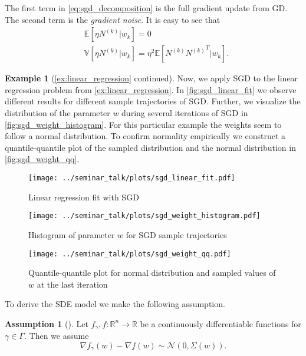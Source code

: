 \documentclass[12pt]{article}
\theoremstyle{definition}
\newtheorem{example}[example]{Example}
\newtheorem{assumption}[assumption]{Assumption}
\numberwithin{equation}{section}
\newcommand{\R}{\mathbb{R}}
\newcommand{\CN}{\mathcal{N}}
\newcommand{\ev}[1]{\mathbb{E}\left[{#1}\right]}
\newcommand{\var}[1]{\mathbb{V}\left[{#1}\right]}
\begin{document}
The first term in \eqref{eq:sgd_decomposition} is the full gradient update from GD. The second term is the \emph{gradient noise}. It is easy to see that 
\begin{align*}
  &\ev{\eta N^{(k)}|w_{k}} = 0 \\
  &\var{\eta N^{(k)}|w_{k}} = \eta^2 \ev{N^{(k)}{N^{(k)}}^T|w_{k}}.
\end{align*}
\begin{example}[\autoref{ex:linear_regression} continued]
  Now, we apply SGD to the linear regression problem from \autoref{ex:linear_regression}. In \autoref{fig:sgd_linear_fit} we observe different results for different sample trajectories of SGD.
  Further, we visualize the distribution of the parameter $w$ during several iterations of SGD in \autoref{fig:sgd_weight_histogram}. For this particular example the weights seem to follow a normal distribution. To confirm normality empirically we construct a quantile-quantile plot of the sampled distribution and the normal distribution in \autoref{fig:sgd_weight_qq}.
  \begin{figure}[htb]
    \centering
    \texttt{[image: ../seminar\_talk/plots/sgd\_linear\_fit.pdf]}
    \caption{Linear regression fit with SGD}
    \label{fig:sgd_linear_fit}
  \end{figure}
  \begin{figure}[htb]
    \centering
    \texttt{[image: ../seminar\_talk/plots/sgd\_weight\_histogram.pdf]}
    \caption{Histogram of parameter $w$ for SGD sample trajectories}
    \label{fig:sgd_weight_histogram}
  \end{figure}
  \begin{figure}[htb]
    \centering
    \texttt{[image: ../seminar\_talk/plots/sgd\_weight\_qq.pdf]}
    \caption{Quantile-quantile plot for normal distribution and sampled values of $w$ at the last iteration}
    \label{fig:sgd_weight_qq}
  \end{figure}
\end{example}
To derive the SDE model we make the following assumption.
\begin{assumption}[]
  \label{as:normality}
  Let $f_{\gamma}, f : \R^n \rightarrow \R$ be a continuously differentiable functions for $\gamma \in \Gamma$. Then we assume 
  \begin{equation*}
    \nabla f_{\gamma}(w) - \nabla f(w) \sim \CN(0, \Sigma(w)).
  \end{equation*}
\end{assumption}
\end{document}
